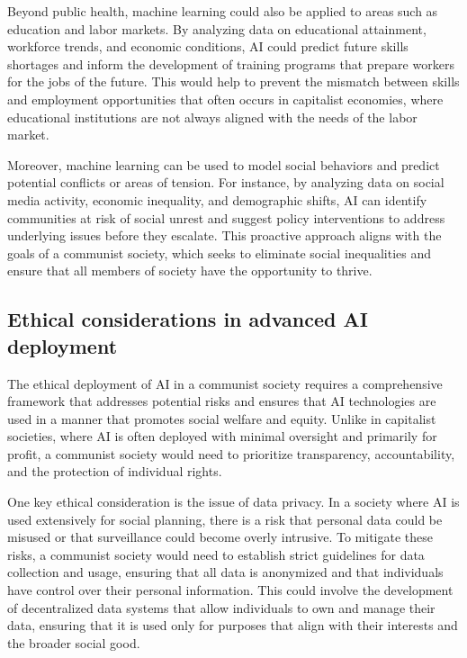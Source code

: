 Beyond public health, machine learning could also be applied to areas such as education and labor markets. By analyzing data on educational attainment, workforce trends, and economic conditions, AI could predict future skills shortages and inform the development of training programs that prepare workers for the jobs of the future. This would help to prevent the mismatch between skills and employment opportunities that often occurs in capitalist economies, where educational institutions are not always aligned with the needs of the labor market.

Moreover, machine learning can be used to model social behaviors and predict potential conflicts or areas of tension. For instance, by analyzing data on social media activity, economic inequality, and demographic shifts, AI can identify communities at risk of social unrest and suggest policy interventions to address underlying issues before they escalate. This proactive approach aligns with the goals of a communist society, which seeks to eliminate social inequalities and ensure that all members of society have the opportunity to thrive.

\subsection{Ethical considerations in advanced AI deployment}

The ethical deployment of AI in a communist society requires a comprehensive framework that addresses potential risks and ensures that AI technologies are used in a manner that promotes social welfare and equity. Unlike in capitalist societies, where AI is often deployed with minimal oversight and primarily for profit, a communist society would need to prioritize transparency, accountability, and the protection of individual rights.

One key ethical consideration is the issue of data privacy. In a society where AI is used extensively for social planning, there is a risk that personal data could be misused or that surveillance could become overly intrusive. To mitigate these risks, a communist society would need to establish strict guidelines for data collection and usage, ensuring that all data is anonymized and that individuals have control over their personal information. This could involve the development of decentralized data systems that allow individuals to own and manage their data, ensuring that it is used only for purposes that align with their interests and the broader social good.

